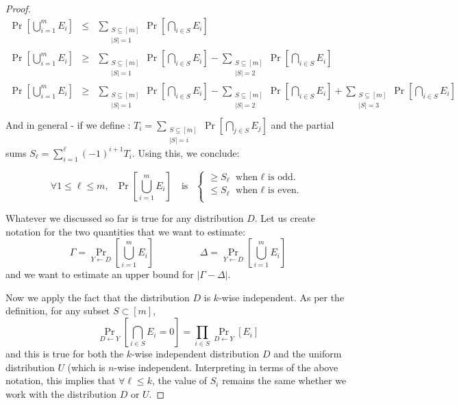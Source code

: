 \begin{proof}
\begin{eqnarray*}
\Pr \left[ \bigcup_{i=1}^m E_i \right] & \le & \sum_{\substack{S \subseteq [m]\\ |S| = 1}} \Pr\left[ \bigcap_{i \in S} E_i \right] \\
\Pr \left[ \bigcup_{i=1}^m E_i \right] & \ge & \sum_{\substack{S \subseteq [m]\\ |S| = 1}} \Pr\left[ \bigcap_{i \in S} E_i \right] - \sum_{\substack{S \subseteq [m]\\ |S| = 2}} \Pr \left[ \bigcap_{i \in S} E_i \right] \\
\Pr \left[ \bigcup_{i=1}^m E_i \right] & \ge & \sum_{\substack{S \subseteq [m]\\ |S| = 1}} \Pr\left[ \bigcap_{i \in S} E_i \right] - \sum_{\substack{S \subseteq [m]\\ |S| = 2}} \Pr \left[ \bigcap_{i \in S} E_i \right] + \sum_{\substack{S \subseteq [m]\\ |S| = 3}} \Pr \left[ \bigcap_{i \in S} E_i \right] \\
\end{eqnarray*}
And in general -  if we define : $T_i = \sum_{\substack{S \subseteq [m]\\ |S| = i}} \Pr \left[ \bigcap_{j \in S} E_j \right]$ and the partial sums $S_\ell = \sum_{i=1}^\ell (-1)^{i+1} T_i$. Using this, we conclude:

$$\forall 1 \le \ell \le m, ~~~\Pr \left[ \bigcup_{i=1}^m E_i \right] ~~~\textrm{ is }~~ \begin{cases}
\ge S_\ell \textrm{ when $\ell$ is odd.}\\
\le S_\ell \textrm{ when $\ell$ is even.}\\
\end{cases}
$$

Whatever we discussed so far is true for any distribution $D$. Let us create notation for the two quantities that we want to estimate:
$$ \Gamma = \Pr_{Y \leftarrow D} \left[ \bigcup_{i=1}^m E_i \right] \hspace{2cm} \Delta = \Pr_{Y \leftarrow D} \left[ \bigcup_{i=1}^m E_i \right] $$
and we want to estimate an upper bound for $|\Gamma - \Delta|$.

Now we apply the fact that the distribution $D$ is $k$-wise independent. As per the definition, for any subset $S \subset [m]$, 
$$\Pr_{D \leftarrow Y} \left[\bigcap_{i \in S} E_i = 0 \right] = \prod_{i\in S} \Pr_{D \leftarrow Y} \left[E_i\right] $$
and this is true for both the $k$-wise independent distribution $D$ and the uniform distribution $U$ (which is $n$-wise independent. Interpreting in terms of the above notation, this implies that $\forall \ell \le k$, the value of $S_i$ remains the same whether we work with the distribution $D$ or $U$.


\end{proof}
